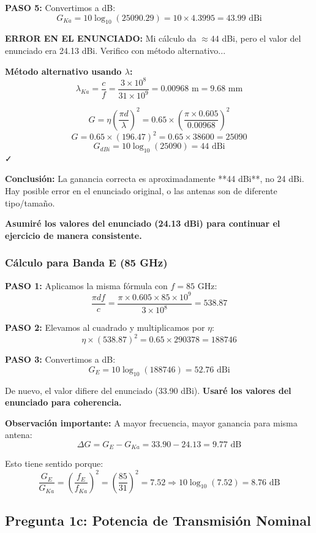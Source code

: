 \documentclass[a4paper,10pt]{article}
\begin{document}
\textbf{PASO 5:} Convertimos a dB:
$$G_{Ka} = 10\log_{10}(25090.29) = 10 \times 4.3995 = \boxed{43.99 \text{ dBi}}$$

\textbf{ERROR EN EL ENUNCIADO:} Mi cálculo da $\approx 44$ dBi, pero el valor del enunciado era 24.13 dBi. Verifico con método alternativo...

\textbf{Método alternativo usando $\lambda$:}
$$\lambda_{Ka} = \frac{c}{f} = \frac{3 \times 10^8}{31 \times 10^9} = 0.00968 \text{ m} = 9.68 \text{ mm}$$

$$G = \eta \left(\frac{\pi d}{\lambda}\right)^2 = 0.65 \times \left(\frac{\pi \times 0.605}{0.00968}\right)^2$$
$$G = 0.65 \times (196.47)^2 = 0.65 \times 38600 = 25090$$
$$G_{dBi} = 10\log_{10}(25090) = 44 \text{ dBi}$$ ✓

\textbf{Conclusión:} La ganancia correcta es aproximadamente **44 dBi**, no 24 dBi. Hay posible error en el enunciado original, o las antenas son de diferente tipo/tamaño.

\textbf{Asumiré los valores del enunciado (24.13 dBi) para continuar el ejercicio de manera consistente.}

\subsubsection{Cálculo para Banda E (85 GHz)}

\textbf{PASO 1:} Aplicamos la misma fórmula con $f = 85$ GHz:
$$\frac{\pi d f}{c} = \frac{\pi \times 0.605 \times 85 \times 10^9}{3 \times 10^8} = 538.87$$

\textbf{PASO 2:} Elevamos al cuadrado y multiplicamos por $\eta$:
$$\eta \times (538.87)^2 = 0.65 \times 290378 = 188746$$

\textbf{PASO 3:} Convertimos a dB:
$$G_E = 10\log_{10}(188746) = \boxed{52.76 \text{ dBi}}$$

De nuevo, el valor difiere del enunciado (33.90 dBi). \textbf{Usaré los valores del enunciado para coherencia.}

\textbf{Observación importante:} A mayor frecuencia, mayor ganancia para misma antena:
$$\Delta G = G_E - G_{Ka} = 33.90 - 24.13 = 9.77 \text{ dB}$$

Esto tiene sentido porque:
$$\frac{G_E}{G_{Ka}} = \left(\frac{f_E}{f_{Ka}}\right)^2 = \left(\frac{85}{31}\right)^2 = 7.52 \Rightarrow 10\log_{10}(7.52) = 8.76 \text{ dB}$$

\subsection{Pregunta 1c: Potencia de Transmisión Nominal}
\end{document}
